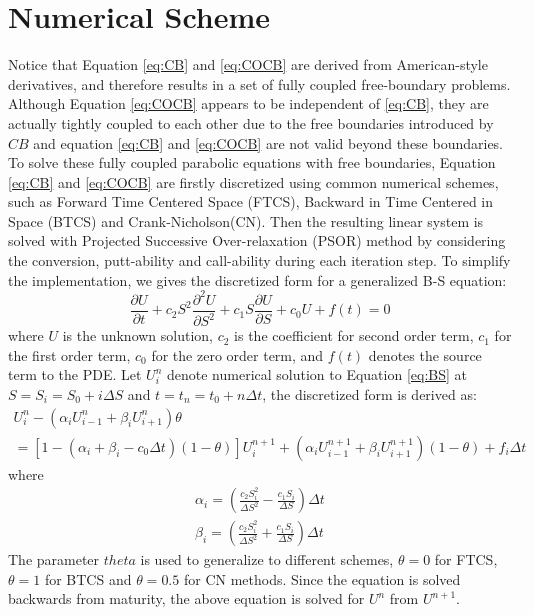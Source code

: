 \documentclass[12pt]{article}
\begin{document}
\section{Numerical Scheme}
Notice that Equation \ref{eq:CB} and \ref{eq:COCB} are derived from American-style derivatives, and therefore results in a set of fully coupled free-boundary problems. Although Equation \ref{eq:COCB} appears to be independent of \ref{eq:CB}, they are actually tightly coupled to each other due to the free boundaries introduced by $CB$ and equation \ref{eq:CB} and \ref{eq:COCB} are not valid beyond these boundaries. To solve these fully coupled parabolic equations with free boundaries, Equation \ref{eq:CB} and \ref{eq:COCB} are firstly discretized using common numerical schemes, such as Forward Time Centered Space (FTCS), Backward in Time Centered in Space (BTCS) and Crank-Nicholson(CN). Then the resulting linear system is solved with Projected Successive Over-relaxation (PSOR) method by considering the conversion, putt-ability and call-ability during each iteration step. To simplify the implementation, we gives the discretized form for a generalized B-S equation:
\begin{equation}
\frac{\partial{U}}{\partial{t}} + 
c_2S^2\frac{\partial^2{U}}{\partial{S}^2} + c_1S\frac{\partial{U}}{\partial{S}} + c_0U + f(t) = 0 \label{eq:BS}
\end{equation}
where $U$ is the unknown solution, $c_2$ is the coefficient for second order term, $c_1$ for the first order term, $c_0$ for the zero order term, and $f(t)$ denotes the source term to the PDE. Let $U^n_i$ denote numerical solution to Equation \ref{eq:BS} at $S = S_i = S_0 + i \Delta S$ and $t = t_n = t_0 + n \Delta t$, the discretized form is derived as:
\begin{eqnarray*}
[1 + (\alpha_{i}+\beta_{i} - c_0 \Delta t)\theta] U_i^n 
- (\alpha_i U_{i-1}^n + \beta_i U_{i+1}^n)\theta \\
= [1 - (\alpha_i+\beta_i - c_0 \Delta t)(1-\theta)] U_i^{n+1} 
+ (\alpha_i U_{i-1}^{n+1} 
+ \beta_i U_{i+1}^{n+1})(1-\theta) + f_i \Delta t
\end{eqnarray*}
where
\begin{eqnarray}
\alpha_i = (\frac{c_2S_i^2}{\Delta S^2} - \frac{c_1S_i}{\Delta S})\Delta t\\
\beta_i =  (\frac{c_2S_i^2}{\Delta S^2} + \frac{c_1S_i}{\Delta S})\Delta t
\end{eqnarray}
The parameter $theta$ is used to generalize to different schemes, $\theta = 0$ for FTCS, $\theta = 1$ for BTCS and $\theta = 0.5$ for CN methods. Since the equation is solved backwards from maturity, the above equation is solved for $U^{n}$ from $U^{n+1}$.
\end{document}
